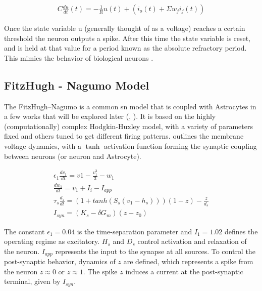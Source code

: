     \begin{align}
        C \frac{du}{dt}(t) = -\frac{1}{R}u(t)+(i_o(t) + \Sigma w_ji_j(t)) \label{eq:lif}
    \end{align}
    
    Once the state variable u (generally thought of as a voltage) reaches a
    certain threshold the neuron outputs a spike. After this time the state
    variable is reset, and is held at that value for a period known as the
    absolute refractory period. This mimics the behavior of biological neurons
    \cite{ponulak_2011}.



    \subsection{FitzHugh - Nagumo Model}
    The FitzHugh–Nagumo is a common \Gls{sn} model that is coupled with
    Astrocytes in a few works that will be explored later (\cite{postnov_2009},
    \cite{postnov_2007}). It is based on the highly (computationally) complex
    Hodgkin-Huxley model, with a variety of parameters fixed and others tuned to
    get different firing patterns. \parencite{postnov_2009} outlines the membrane
    voltage dynamics, with a $\tanh$ activation function forming the synaptic
    coupling between neurons (or neuron and Astrocyte).

    \begin{align}
      \epsilon_1 \frac{dv_1}{dt} = v1 - \frac{v_1^3}{3} -
      w_1 \label{eq:fn_neuron}  \\
      \frac{dw_1}{dt} = v_1 + I_i - I_{app} \\
      \tau_s \frac{d_z}{dt} = (1 + tanh(S_s(v_1 - h_s)))(1 - z) - \frac{z}{d_s} \label{eq:fitz_nn}
      \\
      I_{syn} = (K_s - \delta G_m)(z - z_0)
    \end{align}

    The constant $\epsilon_1 = 0.04$ is the time-separation parameter and
    $I_1 = 1.02$ defines the operating regime as excitatory. $H_s$ and $D_s$
    control activation and relaxation of the neuron. $I_{app}$ represents the
    input to the synapse at all sources. To control the post-synaptic behavior,
    dynamics of $z$ are defined, which represents a spike from the neuron
    $z \approx 0$ or $z \approx 1$. The spike $z$ induces a current at the
    post-synaptic terminal, given by $I_{syn}$.

